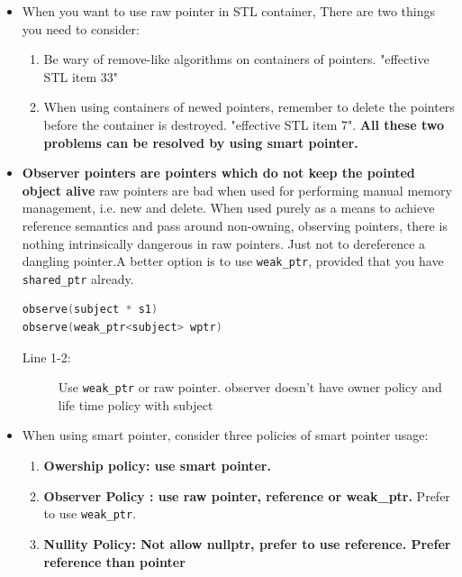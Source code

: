 \documentclass[a4paper,11pt,twoside]{book}
\begin{document}
\begin{itemize}
\item When you want to use raw pointer in STL container, There are two things you need to consider:
\begin{enumerate}
\item  Be wary of remove-like algorithms on containers of pointers. "effective STL item 33"

\item When using containers of newed pointers, remember to delete the pointers before the container is destroyed. "effective STL item 7". \textbf{All these two problems can be resolved by using smart pointer.}
\end{enumerate}

\item \textbf{Observer pointers are pointers which do not keep the pointed object alive} raw pointers are bad when used for performing manual memory management, i.e. new and delete. When used purely as a means to achieve reference semantics and pass around non-owning, observing pointers, there is nothing intrinsically dangerous in raw pointers. Just not to dereference a dangling pointer.A better option is to use \texttt{weak\_ptr}, provided that you have \texttt{shared\_ptr} already.

\begin{lstlisting}[frame=single, language=c++]
observe(subject * s1)
observe(weak_ptr<subject> wptr)
\end{lstlisting}
\begin{description}
	\item[Line 1-2:] Use \texttt{weak\_ptr} or raw pointer. observer doesn't have owner policy and life time policy with subject
\end{description}

\item When using smart pointer, consider three policies of smart pointer usage:
\begin{enumerate}
	\item \textbf{Owership policy: use smart pointer.}
	\item \textbf{Observer Policy : use raw pointer, reference or weak\_ptr.} Prefer to use \texttt{weak\_ptr}.
	\item \textbf{Nullity Policy: Not allow nullptr, prefer to use reference. Prefer reference than pointer}
\end{enumerate}


\end{itemize}
\end{document}
